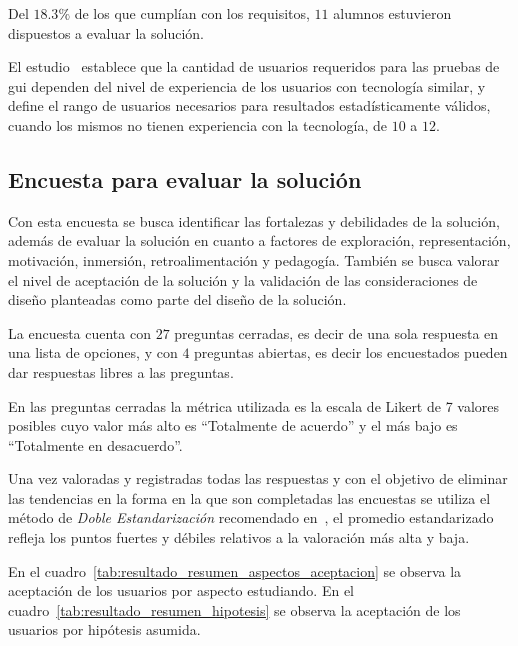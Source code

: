 Del $18.3\%$ de los que cumplían con los requisitos, $11$ alumnos estuvieron
dispuestos a evaluar la solución. 

El estudio~\cite{nielsen2000} establece que la cantidad de usuarios requeridos
para las pruebas de \gls{gui} dependen del nivel de experiencia de los usuarios
con tecnología similar, y~\cite{ritch2009} define el rango de usuarios
necesarios para resultados estadísticamente válidos, cuando los mismos no tienen experiencia con la tecnología, de $10$ a $12$.


\subsection{Encuesta para evaluar la solución}
\label{encuesta_solucion}

Con esta encuesta se busca identificar las fortalezas y debilidades de la
solución, además de evaluar la solución en cuanto a factores de exploración,
representación, motivación, inmersión, retroalimentación y pedagogía. También se
busca valorar el nivel de aceptación de la solución y la validación de las
consideraciones de diseño planteadas como parte del diseño de la solución.

La encuesta cuenta con $27$ preguntas cerradas, es decir de una sola respuesta
en una lista de opciones, y con $4$ preguntas abiertas, es decir los encuestados
pueden dar respuestas libres a las preguntas. 

En las preguntas cerradas la métrica utilizada es la escala de Likert
\cite{Allen:2007} de 7 valores posibles cuyo valor más alto es
\enquote{Totalmente de acuerdo} y el más bajo es \enquote{Totalmente en
    desacuerdo}. 

Una vez valoradas y registradas todas las respuestas y con el 
objetivo de eliminar las tendencias en la forma en la que son completadas las
encuestas\cite{Fischer2010} se utiliza el método de \emph{Doble 
Estandarización} recomendado en~\cite{Pagolu2011}, el promedio estandarizado 
refleja los puntos fuertes y débiles relativos a la valoración más alta y baja.

En el cuadro~\ref{tab:resultado_resumen_aspectos_aceptacion} se observa 
la aceptación de los usuarios por aspecto estudiando. En el 
cuadro~\ref{tab:resultado_resumen_hipotesis} se observa la aceptación
de los usuarios por hipótesis asumida.  

